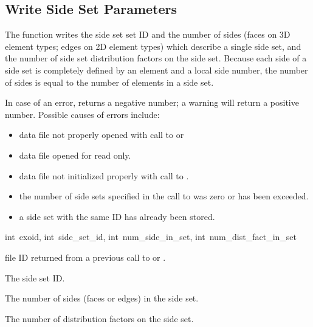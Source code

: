 \subsection{Write Side Set Parameters}

The function  writes the side set set
ID and the number of sides (faces on 3D element types; edges on 2D
element types) which describe a single side set, and the number of
side set distribution factors on the side set. Because each side of a
side set is completely defined by an element and a local side number,
the number of sides is equal to the number of elements in a side set.

In case of an error,  returns a
negative number; a warning will return a positive number. Possible
causes of errors include:

\begin{itemize}
 \item data file not properly opened with call to 
 or 

 \item data file opened for read only.

 \item data file not initialized properly with call to
 .

 \item the number of side sets specified in the call to
  was zero or has been exceeded.

 \item a side set with the same ID has already been stored.
\end{itemize}


{int~exoid,
int~side_set_id,
int~num_side_in_set,
int~num_dist_fact_in_set}

\begin{parameters}
\item[{int} {exoid \R{}}]
\exo{} file ID returned from a previous call to 
or .

\item[{int side_set_id} {\R{}}]
The side set ID.

\item[{int num_side_in_set} {\R{}}]
The number of sides (faces or edges) in the side set.

\item[{int num_dist_fact_in_set} {\R{}}]
The number of distribution factors on the side set.
\end{parameters}

